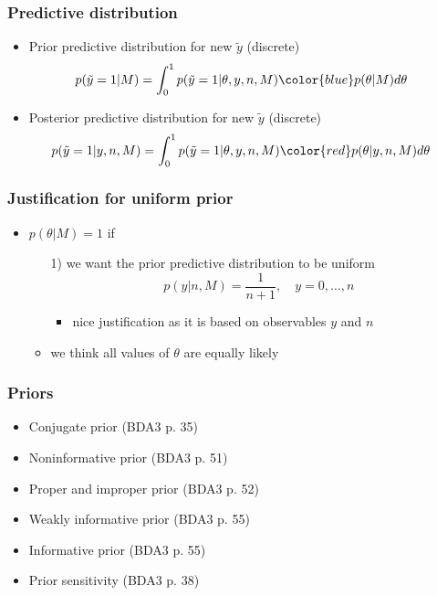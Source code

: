 \documentclass[english,t]{beamer}
\begin{document}
\begin{frame}
  \frametitle{Predictive distribution}

  \begin{itemize}
  \item {\color{blue} Prior predictive} distribution for new $\tilde{y}$ (discrete)
    \begin{align*}
      p(\tilde{y}=1|M) &= \int_0^1 p(\tilde{y}=1|\theta,y,n,M){\color{blue}p(\theta|M)}d\theta
    \end{align*}
  \item {\color{red} Posterior predictive} distribution for new $\tilde{y}$ (discrete)
    \begin{align*}
      p(\tilde{y}=1|y,n,M) &= \int_0^1 p(\tilde{y}=1|\theta,y,n,M){\color{red}p(\theta|y,n,M)}d\theta
    \end{align*}
  \end{itemize}
\end{frame}

\begin{frame}
  \frametitle{Justification for uniform prior}

  \begin{itemize}
  \item $p(\theta|M)=1$ if
    \begin{itemize}
    \item[1)] we want the prior predictive distribution to be uniform
      \begin{equation*}
        p(y|n,M) = \frac{1}{n+1}, \quad y=0,\ldots,n
      \end{equation*}
      \begin{itemize}
      \item nice justification as it is based on observables $y$ and $n$
      \end{itemize}
     \item<2->[2)] we think all values of $\theta$ are equally likely
    \end{itemize} 
  \end{itemize}

\end{frame}


\begin{frame}
  \frametitle{Priors}

  \begin{itemize}
  \item Conjugate prior (BDA3 p. 35)
  \item Noninformative prior (BDA3 p. 51)
  \item Proper and improper prior (BDA3 p. 52)
  \item Weakly informative prior (BDA3 p. 55)
  \item Informative prior (BDA3 p. 55)
  \item Prior sensitivity (BDA3 p. 38)
  \end{itemize}

\end{frame}
\end{document}

